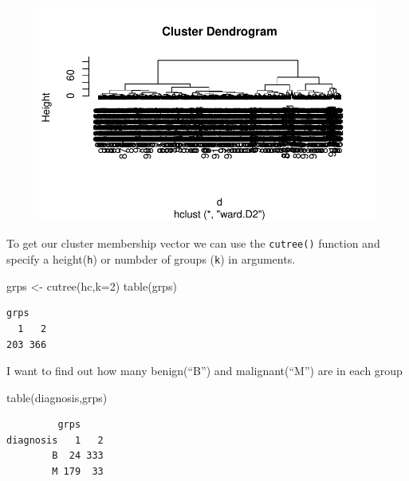 \documentclass[
  letterpaper,
  DIV=11,
  numbers=noendperiod]{scrartcl}
\newenvironment{Shaded}{\begin{snugshade}}{\end{snugshade}}
\newcommand{\AttributeTok}[1]{\textcolor[rgb]{0.40,0.45,0.13}{#1}}
\newcommand{\DecValTok}[1]{\textcolor[rgb]{0.68,0.00,0.00}{#1}}
\newcommand{\FunctionTok}[1]{\textcolor[rgb]{0.28,0.35,0.67}{#1}}
\newcommand{\NormalTok}[1]{\textcolor[rgb]{0.00,0.23,0.31}{#1}}
\newcommand{\OtherTok}[1]{\textcolor[rgb]{0.00,0.23,0.31}{#1}}
\begin{document}
\begin{figure}[H]

{\centering \includegraphics{class08_files/figure-pdf/unnamed-chunk-13-1.pdf}

}

\end{figure}

To get our cluster membership vector we can use the \texttt{cutree()}
function and specify a height(\texttt{h}) or numbder of groups
(\texttt{k}) in arguments.

\begin{Shaded}
\begin{Highlighting}[]
\NormalTok{grps }\OtherTok{\textless{}{-}} \FunctionTok{cutree}\NormalTok{(hc,}\AttributeTok{k=}\DecValTok{2}\NormalTok{)}
\FunctionTok{table}\NormalTok{(grps)}
\end{Highlighting}
\end{Shaded}

\begin{verbatim}
grps
  1   2 
203 366 
\end{verbatim}

I want to find out how many benign(``B'') and malignant(``M'') are in
each group

\begin{Shaded}
\begin{Highlighting}[]
\FunctionTok{table}\NormalTok{(diagnosis,grps)}
\end{Highlighting}
\end{Shaded}

\begin{verbatim}
         grps
diagnosis   1   2
        B  24 333
        M 179  33
\end{verbatim}
\end{document}
